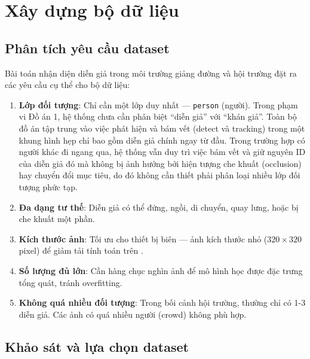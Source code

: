 \chapter{Xây dựng bộ dữ liệu}
\label{ch:dataset}

\section{Phân tích yêu cầu dataset}
\label{sec:ds_requirements}

Bài toán nhận diện diễn giả trong môi trường giảng đường và hội trường đặt ra các yêu cầu cụ thể cho bộ dữ liệu:

\begin{enumerate}[label=\arabic*)]
    \item \textbf{Lớp đối tượng}: Chỉ cần một lớp duy nhất --- \texttt{person} (người). Trong phạm vi Đồ án 1, hệ thống chưa cần phân biệt ``diễn giả'' với ``khán giả''. Toàn bộ đồ án tập trung vào việc phát hiện và bám vết (detect và tracking) trong một khung hình hẹp chỉ bao gồm diễn giả chính ngay từ đầu. Trong trường hợp có người khác đi ngang qua, hệ thống vẫn duy trì việc bám vết và giữ nguyên ID của diễn giả đó mà không bị ảnh hưởng bởi hiện tượng che khuất (occlusion) hay chuyển đổi mục tiêu, do đó không cần thiết phải phân loại nhiều lớp đối tượng phức tạp.
    
    \item \textbf{Đa dạng tư thế}: Diễn giả có thể đứng, ngồi, di chuyển, quay lưng, hoặc bị che khuất một phần.
    
    \item \textbf{Kích thước ảnh}: Tối ưu cho thiết bị biên --- ảnh kích thước nhỏ ($320 \times 320$ pixel) để giảm tải tính toán trên \rpi.
    
    \item \textbf{Số lượng đủ lớn}: Cần hàng chục nghìn ảnh để mô hình học được đặc trưng tổng quát, tránh overfitting.
    
    \item \textbf{Không quá nhiều đối tượng}: Trong bối cảnh hội trường, thường chỉ có 1-3 diễn giả. Các ảnh có quá nhiều người (crowd) không phù hợp.
\end{enumerate}

\section{Khảo sát và lựa chọn dataset}
\label{sec:ds_survey}

